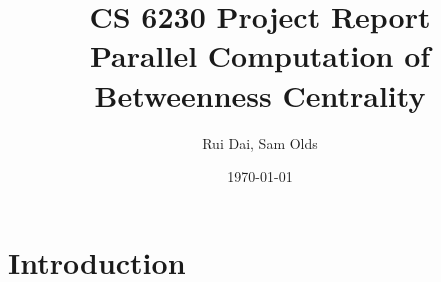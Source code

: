 \documentclass[11pt,a4paper,titlepage]{article}
\title{CS 6230 Project Report\\\textbf{Parallel Computation of Betweenness Centrality}}
\author{Rui Dai, Sam Olds}
\date{\today}
\begin{document}
\maketitle
\newpage





\section{Introduction} %
\label{sec:intro}
\end{document}
